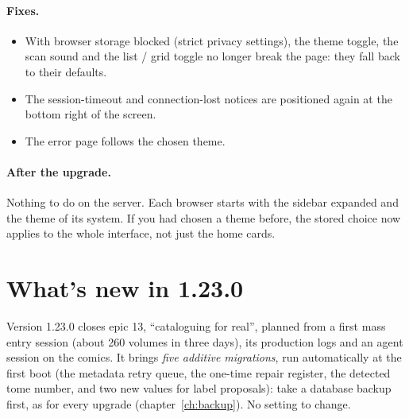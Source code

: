 \paragraph{Fixes.}
\begin{itemize}
  \item With browser storage blocked (strict privacy settings), the
        theme toggle, the scan sound and the list / grid toggle no
        longer break the page: they fall back to their defaults.
  \item The session-timeout and connection-lost notices are positioned
        again at the bottom right of the screen.
  \item The error page follows the chosen theme.
\end{itemize}

\paragraph{After the upgrade.} Nothing to do on the server. Each
browser starts with the sidebar expanded and the theme of its system.
If you had chosen a theme before, the stored choice now applies to the
whole interface, not just the home cards.

\section{What's new in 1.23.0}\label{sec:whats-new-1.23.0}

Version 1.23.0 closes epic 13, ``cataloguing for real'', planned from a
first mass entry session (about 260 volumes in three days), its
production logs and an agent session on the comics. It brings
\emph{five additive migrations}, run automatically at the first boot
(the metadata retry queue, the one-time repair register, the detected
tome number, and two new values for label proposals): take a database
backup first, as for every upgrade (chapter~\ref{ch:backup}). No
setting to change.

